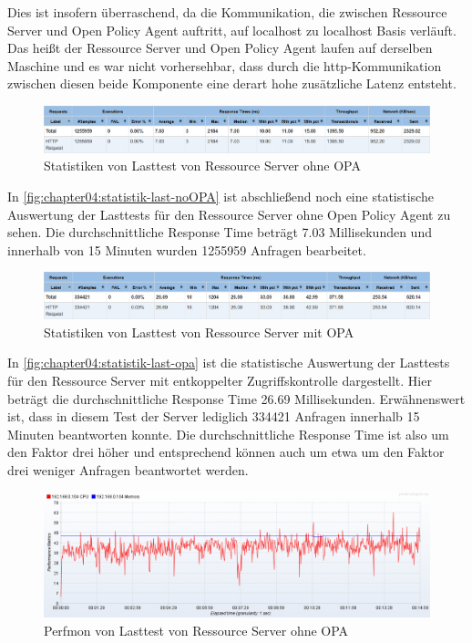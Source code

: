 Dies ist insofern überraschend, da die Kommunikation, die zwischen Ressource Server und Open Policy Agent auftritt, auf localhost zu localhost Basis verläuft. Das heißt der Ressource Server und Open Policy Agent laufen auf derselben Maschine und es war nicht vorhersehbar, dass durch die http-Kommunikation zwischen diesen beide Komponente eine derart hohe zusätzliche Latenz entsteht. 

\begin{figure}[htbp]
  \centering
  \includegraphics[width=1.0\textwidth]{gfx/statistik-last-noOPA.png}
  \caption{Statistiken von Lasttest von Ressource Server ohne OPA}
  \label{fig:chapter04:statistik-last-noOPA}
\end{figure}

In \autoref{fig:chapter04:statistik-last-noOPA} ist abschließend noch eine statistische Auswertung der Lasttests für den Ressource Server ohne Open Policy Agent zu sehen. Die durchschnittliche Response Time beträgt 7.03 Millisekunden und innerhalb von 15 Minuten wurden 1255959 Anfragen bearbeitet. 

\begin{figure}[htbp]
  \centering
  \includegraphics[width=1.0\textwidth]{gfx/statistik-last-opa.png}
  \caption{Statistiken von Lasttest von Ressource Server mit OPA}
  \label{fig:chapter04:statistik-last-opa}
\end{figure}

In \autoref{fig:chapter04:statistik-last-opa} ist die statistische Auswertung der Lasttests für den Ressource Server mit entkoppelter Zugriffskontrolle dargestellt. Hier beträgt die durchschnittliche Response Time 26.69 Millisekunden. Erwähnenswert ist, dass in diesem Test der Server lediglich 334421 Anfragen innerhalb 15 Minuten beantworten konnte. Die durchschnittliche Response Time ist also um den Faktor drei höher und entsprechend können auch um etwa um den Faktor drei weniger Anfragen beantwortet werden.

\begin{figure}[htbp]
  \centering
  \includegraphics[width=1.0\textwidth]{gfx/perfmon-last-noOPA.png}
  \caption{Perfmon von Lasttest von Ressource Server ohne OPA}
  \label{fig:chapter04:perfmon-last-noOPA}
\end{figure}

